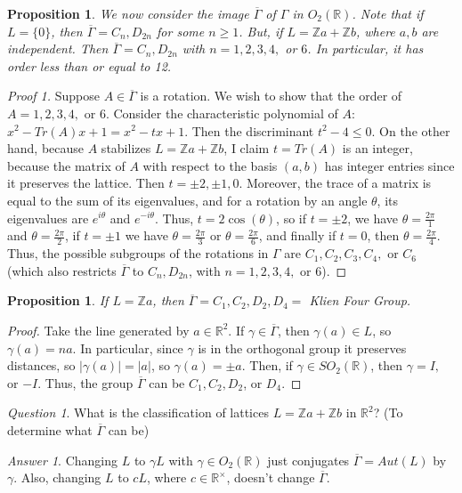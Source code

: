 \documentclass[12pt]{article}
\newtheorem{prop}[thm]{Proposition}
\theoremstyle{definition}
\theoremstyle{remark}
\newtheorem*{qst}{Question}
\newtheorem*{ans}{Answer}
\numberwithin{equation}{section}
\newcommand\R{\mathbb R}    %
\newcommand\Z{\mathbb Z}    %
\begin{document}
\begin{prop}
        We now consider the image $\overline{\Gamma}$ of $\Gamma$ in $O_2(\R)$. Note that if $L = \{0\}$, then $\overline{\Gamma} = C_n, D_{2n}$ for some $n \geq 1$. But, if $L = \Z a + \Z b$, where $a,b$ are independent. Then $\overline{\Gamma} = C_n,D_{2n}$ with $n = 1,2,3,4,$ or $6$. In particular, it has order less than or equal to 12.
\end{prop}
\begin{proof}
        [Proof 1] Suppose $A \in \overline{\Gamma}$ is a rotation. We wish to show that the order of $A = 1,2,3,4,$ or $6$. Consider the characteristic polynomial of $A$: $x^2 - Tr(A)x + 1 = x^2 -tx +1$. Then the discriminant $t^2 - 4 \leq 0$. On the other hand, because $A$ stabilizes $L = \Z a + \Z b$, I claim $t = Tr(A)$ is an integer, because the matrix of $A$ with respect to the basis $(a,b)$ has integer entries since it preserves the lattice. Then $t = \pm 2, \pm 1, 0$. Moreover, the trace of a matrix is equal to the sum of its eigenvalues, and for a rotation by an angle $\theta$, its eigenvalues are $e^{i\theta}$ and $e^{-i\theta}$. Thus, $t = 2\cos(\theta)$, so if $t = \pm 2$, we have $\theta = \frac{2\pi}{1}$ and $\theta = \frac{2\pi}{2}$, if $t = \pm 1$ we have $\theta = \frac{2\pi}{3}$ or $\theta = \frac{2\pi}{6}$, and finally if $t = 0$, then $\theta = \frac{2\pi}{4}$. Thus, the possible subgroups of the rotations in $\Gamma$ are $C_1,C_2,C_3,C_4,$ or $C_6$ (which also restricts $\overline{\Gamma}$ to $C_n,D_{2n}$, with $n=1,2,3,4,$ or $6$).
\end{proof}


\vspace{15pt}

\begin{prop}
        If $L = \Z a$, then $\overline{\Gamma} = C_1,C_2,D_2,D_4=$ Klien Four Group.
\end{prop}
\begin{proof}
        Take the line generated by $a \in \R^2$. If $\gamma \in \overline{\Gamma}$, then $\gamma(a) \in L$, so $\gamma(a) = na$. In particular, since $\gamma$ is in the orthogonal group it preserves distances, so $|\gamma(a)| = |a|$, so $\gamma(a) = \pm a$. Then, if $\gamma \in SO_2(\R)$, then $\gamma = I, $ or $-I$. Thus, the group $\overline{\Gamma}$ can be $C_1, C_2,D_2$, or $D_4$.
\end{proof}

\vspace{15pt}


\begin{qst}
        What is the classification of lattices $L = \Z a + \Z b$ in $\R^2$? (To determine what $\overline{\Gamma}$ can be)
\end{qst}
\begin{ans}
        Changing $L$ to $\gamma L$ with $\gamma \in O_2(\R)$ just conjugates $\overline{\Gamma} = Aut(L)$ by $\gamma$. Also, changing $L$ to $cL$, where $c \in \R^{\times}$, doesn't change $\overline{\Gamma}$.
\end{ans}
\end{document}
